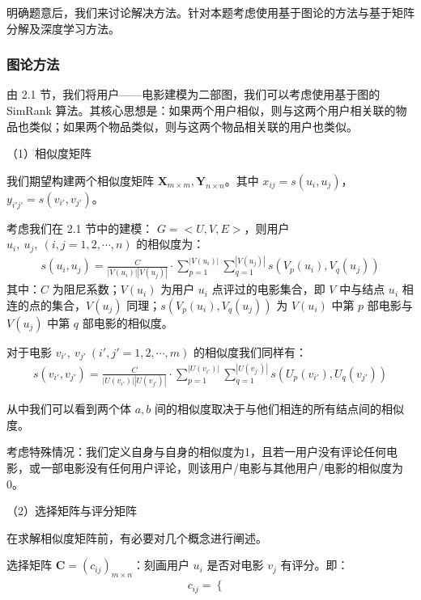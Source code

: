 \xiaosi\begin{spacing}{1.5}
明确题意后，我们来讨论解决方法。针对本题考虑使用基于图论的方法与基于矩阵分解及深度学习方法。
\subsubsection{图论方法}
由 2.1 节，我们将用户——电影建模为二部图，我们可以考虑使用基于图的 SimRank \cite{2}算法。其核心思想是\cite{3}：如果两个用户相似，则与这两个用户相关联的物品也类似；如果两个物品类似，则与这两个物品相关联的用户也类似。\par
（1）相似度矩阵\par
我们期望构建两个相似度矩阵 $\mathbf{X}_{m\times m},\mathbf{Y}_{n\times n}$。其中 $x_{ij} = s(u_i,u_j)$，$y_{i'j'}=s(v_{i'},v_{j'})$。\par
考虑我们在 2.1 节中的建模： $G=<U,V,E>$，则用户 $u_i,\ u_j,\ (i,j=1,2,\cdots,n)$ 的相似度为：
{\setlength\abovedisplayskip{1pt}
\setlength\belowdisplayskip{1pt}
\begin{align}
s(u_i,u_j)=\frac{C}{|V(u_i)||V(u_j)|}\cdot \sum_{p=1}^{|V(u_i)|}\sum_{q=1}^{|V(u_j)|} {s(V_p(u_i),V_q(u_j))}
\end{align}
}
其中：$C$ 为阻尼系数；$V(u_i)$ 为用户 $u_i$ 点评过的电影集合，即 $V$ 中与结点 $u_i$ 相连的点的集合，$V(u_j)$ 同理；$s(V_p(u_i),V_q(u_j))$ 为 $V(u_i)$ 中第 $p$ 部电影与 $V(u_j)$ 中第 $q$ 部电影的相似度。\par
对于电影 $v_{i'},\ v_{j'}\ (i',j'=1,2,\cdots,m)$ 的相似度我们同样有：
{\setlength\abovedisplayskip{1pt}
\setlength\belowdisplayskip{1pt}
\begin{align}
s(v_{i'},v_{j'})=\frac{C}{|U(v_{i'})||U(v_{j'})|}\cdot \sum_{p=1}^{|U(v_{i'})|}\sum_{q=1}^{|U(v_{j'})|} {s(U_p(v_{i'}),U_q(v_{j'}))}
\end{align}
}\par
从中我们可以看到两个体 $a,b$ 间的相似度取决于与他们相连的所有结点间的相似度。\par
考虑特殊情况：我们定义自身与自身的相似度为1，且若一用户没有评论任何电影，或一部电影没有任何用户评论，则该用户/电影与其他用户/电影的相似度为0。\par
（2）选择矩阵与评分矩阵\par
在求解相似度矩阵前，有必要对几个概念进行阐述。\par
选择矩阵 $\mathbf{C}=(c_{ij})_{m\times n}$：刻画用户 $u_i$ 是否对电影 $v_j$ 有评分。即：
{\setlength\abovedisplayskip{1pt}
\setlength\belowdisplayskip{1pt}
\begin{align}
c_{ij} = 
\begin{cases}

\end{cases}
\end{align}}
\end{spacing}
